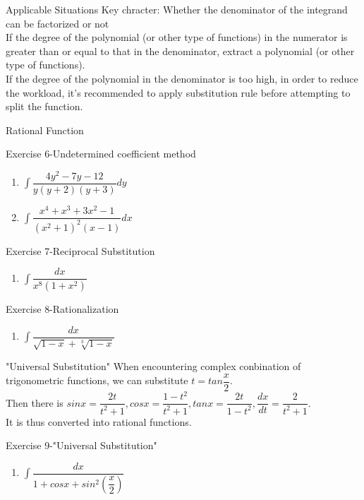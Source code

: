 \documentclass{beamer}
\begin{document}
\begin{frame}{Applicable Situations}
Key chracter: Whether the denominator of the integrand can be factorized or not\\
\bigskip
If the degree of the polynomial (or other type of functions) in the numerator is greater than or equal to that in the denominator, \alert{extract a polynomial (or other type of functions)}.\\
\bigskip
If the degree of the polynomial in the denominator is too high, in order to reduce the workload, it's recommended to \alert{apply substitution rule before attempting to split the function}.
\end{frame}

\begin{frame}{Rational Function}
    \begin{block}{Exercise 6-Undetermined coefficient method}
    \begin{enumerate}
        \item $\int \dfrac{4y^2-7y-12}{y(y+2)(y+3)}dy$
        \item $\int \dfrac{x^4+x^3+3x^2-1}{(x^2+1)^2(x-1)}dx$
    \end{enumerate}
    \end{block}
    \begin{block}{Exercise 7-Reciprocal Substitution}
    \begin{enumerate}
        \item $\int \dfrac{dx}{x^8(1+x^2)}$
    \end{enumerate}
    \end{block}
    \begin{block}{Exercise 8-Rationalization}
    \begin{enumerate}
        \item $\int \dfrac{dx}{\sqrt{1-x}+\sqrt[3]{1-x}}$
    \end{enumerate}
    \end{block}
\end{frame}

\begin{frame}{"Universal Substitution"}
    When encountering complex conbination of trigonometric functions, we can substitute $t=tan\dfrac{x}{2}$.\\
    Then there is $sinx=\dfrac{2t}{t^2+1}, cosx=\dfrac{1-t^2}{t^2+1},tanx=\dfrac{2t}{1-t^2},\dfrac{dx}{dt}=\dfrac{2}{t^2+1}$.\\
    It is thus converted into rational functions.
    \vspace{1cm}
    \begin{block}{Exercise 9-"Universal Substitution"}
    \begin{enumerate}
        \item $\int \dfrac{dx}{1+cosx+sin^2(\dfrac{x}{2})}$
    \end{enumerate}
    \end{block}
\end{frame}
\end{document}
